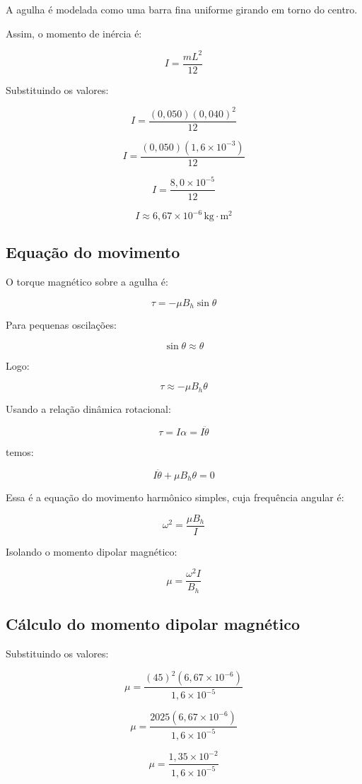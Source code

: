 \documentclass[12pt,a4paper]{article}
\begin{document}
A agulha é modelada como uma barra fina uniforme girando em torno do centro.

Assim, o momento de inércia é:

\[
I = \frac{mL^2}{12}
\]

Substituindo os valores:

\[
I =
\frac{
(0,050)(0,040)^2
}{12}
\]

\[
I =
\frac{
(0,050)(1,6\times10^{-3})
}{12}
\]

\[
I =
\frac{
8,0\times10^{-5}
}{12}
\]

\[
I \approx 6,67\times10^{-6}\,\text{kg}\cdot\text{m}^2
\]


\subsection*{Equação do movimento}

O torque magnético sobre a agulha é:

\[
\tau = -\mu B_h \sin\theta
\]

Para pequenas oscilações:

\[
\sin\theta \approx \theta
\]

Logo:

\[
\tau \approx -\mu B_h \theta
\]

Usando a relação dinâmica rotacional:

\[
\tau = I\alpha = I\ddot{\theta}
\]

temos:

\[
I\ddot{\theta} + \mu B_h \theta = 0
\]

Essa é a equação do movimento harmônico simples, cuja frequência angular é:

\[
\omega^2 = \frac{\mu B_h}{I}
\]

Isolando o momento dipolar magnético:

\[
\mu = \frac{\omega^2 I}{B_h}
\]


\subsection*{Cálculo do momento dipolar magnético}

Substituindo os valores:

\[
\mu =
\frac{
(45)^2(6,67\times10^{-6})
}{
1,6\times10^{-5}
}
\]

\[
\mu =
\frac{
2025(6,67\times10^{-6})
}{
1,6\times10^{-5}
}
\]

\[
\mu =
\frac{
1,35\times10^{-2}
}{
1,6\times10^{-5}
}
\]
\end{document}
